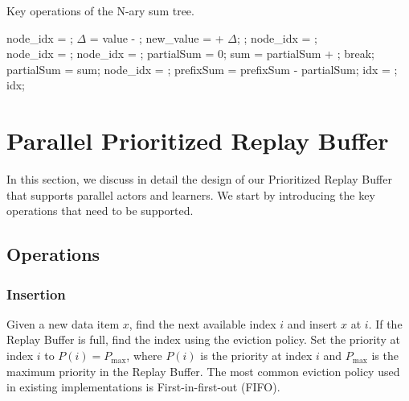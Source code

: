 \begin{algorithm}[!t]
    \caption{Key operations of the N-ary sum tree.}
    \label{alg:n_nary_sum_tree_func}
    \begin{algorithmic}[1]
          \State node\_idx = ;
          \State $\Delta$ = value - ;
              \State new\_value =  + $\Delta$;
              \State {};
              \State node\_idx = ;
          \EndWhile
      \EndFunction
      \\
          \State node\_idx = ;
              \State node\_idx = ;
              \State partialSum = 0;
                  \State sum = partialSum + ;
                      \State break;
                  \EndIf
                  \State partialSum = sum;
                  \State node\_idx = ;
              \EndFor
              \State prefixSum = prefixSum - partialSum;
          \EndWhile
          \State idx = ;
          \State \Return idx;
      \EndFunction
    \end{algorithmic}
\end{algorithm}

\section{Parallel Prioritized Replay Buffer}\label{sec:parallel_per}
In this section, we discuss in detail the design of our Prioritized Replay Buffer that supports parallel actors and learners. We start by introducing the key operations that need to be supported.
\subsection{Operations}\label{sec:parallel_per_ops}
\subsubsection{Insertion}
Given a new data item $x$, find the next available index $i$ and insert $x$ at $i$. If the Replay Buffer is full, find the index using the eviction policy. Set the priority at index $i$ to $P(i)=P_{\max}$, where $P(i)$ is the priority at index $i$ and $P_{\max}$ is the maximum priority in the Replay Buffer. The most common eviction policy used in existing implementations is First-in-first-out (FIFO).
